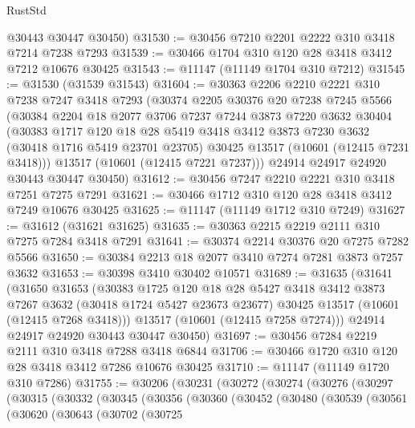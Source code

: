 \begin{lexlean}{RustStd}
\begin{coremodule}
      @30443
      @30447
      @30450)
@31530 := @30456 @7210 @2201 @2222 @310 @3418 @7214 @7238 @7293
@31539 := @30466 @1704 @310 @120 @28 @3418 @3412 @7212 @10676 @30425
@31543 := @11147 (@11149 @1704 @310 @7212)
@31545 := @31530 (@31539 @31543)
@31604 := @30363
    @2206
    @2210
    @2221
    @310
    @7238
    @7247
    @3418
    @7293
    (@30374
      @2205
      @30376
      @20
      @7238
      @7245
      @5566
      (@30384
        @2204
        @18
        @2077
        @3706
        @7237
        @7244
        @3873
        @7220
        @3632
        @30404
        (@30383
          @1717
          @120
          @18
          @28
          @5419
          @3418
          @3412
          @3873
          @7230
          @3632
          (@30418 @1716 @5419 @23701 @23705)
          @30425
          @13517
          (@10601 (@12415 @7231 @3418)))
        @13517
        (@10601 (@12415 @7221 @7237)))
      @24914
      @24917
      @24920
      @30443
      @30447
      @30450)
@31612 := @30456 @7247 @2210 @2221 @310 @3418 @7251 @7275 @7291
@31621 := @30466 @1712 @310 @120 @28 @3418 @3412 @7249 @10676 @30425
@31625 := @11147 (@11149 @1712 @310 @7249)
@31627 := @31612 (@31621 @31625)
@31635 := @30363 @2215 @2219 @2111 @310 @7275 @7284 @3418 @7291
@31641 := @30374 @2214 @30376 @20 @7275 @7282 @5566
@31650 := @30384 @2213 @18 @2077 @3410 @7274 @7281 @3873 @7257 @3632
@31653 := @30398 @3410 @30402 @10571
@31689 := @31635
    (@31641
      (@31650
        @31653
        (@30383
          @1725
          @120
          @18
          @28
          @5427
          @3418
          @3412
          @3873
          @7267
          @3632
          (@30418 @1724 @5427 @23673 @23677)
          @30425
          @13517
          (@10601 (@12415 @7268 @3418)))
        @13517
        (@10601 (@12415 @7258 @7274)))
      @24914
      @24917
      @24920
      @30443
      @30447
      @30450)
@31697 := @30456 @7284 @2219 @2111 @310 @3418 @7288 @3418 @6844
@31706 := @30466 @1720 @310 @120 @28 @3418 @3412 @7286 @10676 @30425
@31710 := @11147 (@11149 @1720 @310 @7286)
@31755 := @30206
    (@30231
      (@30272
        (@30274
          (@30276
            (@30297
              (@30315
                (@30332
                  (@30345
                    (@30356
                      (@30360
                        (@30452
                          (@30480
                            (@30539
                              (@30561
                                (@30620
                                  (@30643
                                    (@30702
                                      (@30725

\end{coremodule}
\end{lexlean}
